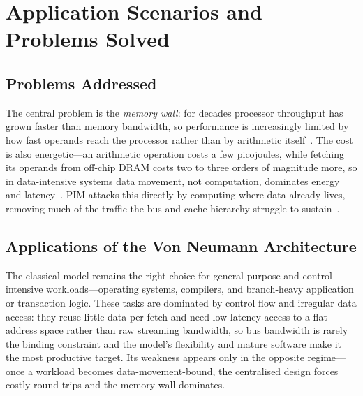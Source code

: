 \documentclass{article} %
\begin{document}
\section{Application Scenarios and Problems Solved}
\label{sec:app}

\subsection{Problems Addressed}
The central problem is the \emph{memory wall}: for decades processor throughput
has grown faster than memory bandwidth, so performance is increasingly limited
by how fast operands reach the processor rather than by arithmetic
itself~\citep{wulf1995memory}. The cost is also energetic---an arithmetic
operation costs a few picojoules, while fetching its operands from off-chip DRAM
costs two to three orders of magnitude more, so in data-intensive systems data
movement, not computation, dominates energy and
latency~\citep{horowitz2014energy}. PIM attacks this directly by computing where
data already lives, removing much of the traffic the bus and cache hierarchy
struggle to sustain~\citep{sebastian2020memory,mutlu2021primer}.

\subsection{Applications of the Von Neumann Architecture}
The classical model remains the right choice for general-purpose and
control-intensive workloads---operating systems, compilers, and branch-heavy
application or transaction logic. These tasks are dominated by control flow and
irregular data access: they reuse little data per fetch and need low-latency
access to a flat address space rather than raw streaming bandwidth, so bus
bandwidth is rarely the binding constraint and the model's flexibility and
mature software make it the most productive target. Its weakness appears only in
the opposite regime---once a workload becomes data-movement-bound, the
centralised design forces costly round trips and the memory wall dominates.
\end{document}
